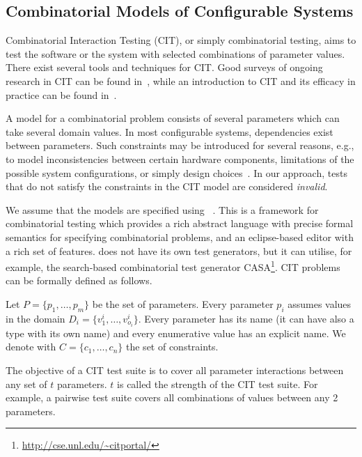 	\subsection{Combinatorial Models of Configurable Systems}
	\begin{tikzborder}{\cite{Gargantini16:validation}}
	Combinatorial Interaction Testing (CIT), or simply combinatorial testing, 
	aims to test the software
	or the system with selected combinations of parameter values. 
	There exist several tools and techniques for CIT. Good surveys of ongoing research in CIT can be found in~\cite{GrindalSTVR05,NieL11},
	while an introduction to CIT and its efficacy in practice can be found
	in~\cite{kuhncomputer09,Petke15:practical}. 
	
	A model for a combinatorial problem consists of several parameters %
	which can take several domain values. 
	In most configurable systems, dependencies exist between parameters. 
	Such constraints may be introduced for several reasons, e.g., to model inconsistencies between certain hardware components, limitations of the possible system configurations, or simply design choices~\cite{CohenTSE08}. 
	In our approach, tests that do not satisfy the constraints in the CIT model are considered \emph{invalid}.
	
	We assume that the models are specified using \citlab{}~\cite{citlab12,citlab13ttt}.
	This is a framework for combinatorial testing which provides a rich abstract language with precise formal semantics for specifying
	combinatorial problems, and an eclipse-based editor with a rich set of features. %
	\citlab{} does not have its own test generators, but it can utilise, for example, the search-based combinatorial test generator  CASA\footnote{\url{http://cse.unl.edu/~citportal/}}\cite{CASASSBSE09}. CIT problems can be formally defined as follows.
	
	\begin{defn}\label{def:citmodel1}
		Let $P=\{p_{1},\dots,p_{m}\}$ be the
		set of parameters. Every parameter $p_{i}$ assumes values in the domain $D_{i}=\{v_{1}^{i},\ldots,v_{o_{i}}^{i}\}$. 
		Every parameter has its name (it can have also a type with its own name) and every enumerative value has an explicit name. We denote with $C=\{c_{1},\ldots,c_{n}\}$
		the set of constraints.
	\end{defn}	
	
	\begin{defn}\label{def:citstrength}
		The objective of a CIT test suite is to cover all parameter interactions between any set of $t$ parameters. $t$ is called the strength of the CIT test suite. For example, a pairwise test suite covers all combinations of values between any 2 parameters.
	\end{defn}
	\be
	

\end{tikzborder}
